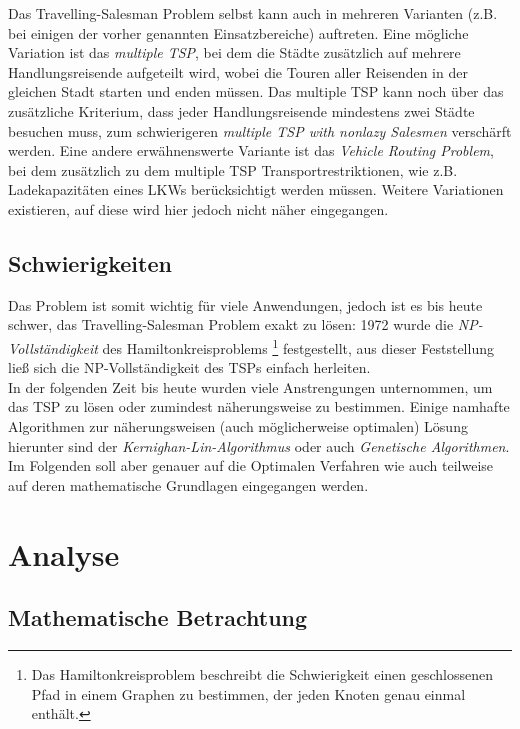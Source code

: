 \documentclass[a4paper, 11pt]{article}
\begin{document}
Das Travelling-Salesman Problem selbst kann auch in mehreren Varianten (z.B.
bei einigen der vorher genannten Einsatzbereiche) auftreten. Eine mögliche
Variation ist das \textit{multiple TSP}, bei dem die Städte zusätzlich auf
mehrere Handlungsreisende aufgeteilt wird, wobei die Touren aller Reisenden
in der gleichen Stadt starten und enden müssen. Das multiple TSP kann noch
über das zusätzliche Kriterium, dass jeder Handlungsreisende mindestens zwei
Städte besuchen muss, zum schwierigeren \textit{multiple TSP with nonlazy
Salesmen} verschärft werden. Eine andere erwähnenswerte Variante ist das
\textit{Vehicle Routing Problem}, bei dem zusätzlich zu dem multiple TSP
Transportrestriktionen, wie z.B. Ladekapazitäten eines LKWs berücksichtigt werden
müssen. Weitere Variationen existieren, auf diese wird hier jedoch nicht näher
eingegangen.

\subsection{Schwierigkeiten}

Das Problem ist somit wichtig für viele Anwendungen, jedoch ist es bis heute
schwer, das Travelling-Salesman Problem exakt zu lösen: 1972 wurde die
\textit{NP-Vollständigkeit} des Hamiltonkreisproblems \footnote{
  Das Hamiltonkreisproblem beschreibt die Schwierigkeit einen
  geschlossenen Pfad in einem Graphen zu bestimmen, der jeden Knoten genau
  einmal enthält.
} festgestellt, aus dieser Feststellung ließ sich die NP-Vollständigkeit
des TSPs einfach herleiten. \\

In der folgenden Zeit bis heute wurden viele Anstrengungen unternommen, um das
TSP zu lösen oder zumindest näherungsweise zu bestimmen. Einige namhafte Algorithmen
zur näherungsweisen (auch möglicherweise optimalen) Lösung hierunter sind der
\textit{Kernighan-Lin-Algorithmus} oder auch \textit{Genetische Algorithmen}. Im
Folgenden soll aber genauer auf die Optimalen Verfahren wie auch teilweise auf deren
mathematische Grundlagen eingegangen werden.

\section{Analyse}

\subsection{Mathematische Betrachtung}
\end{document}
